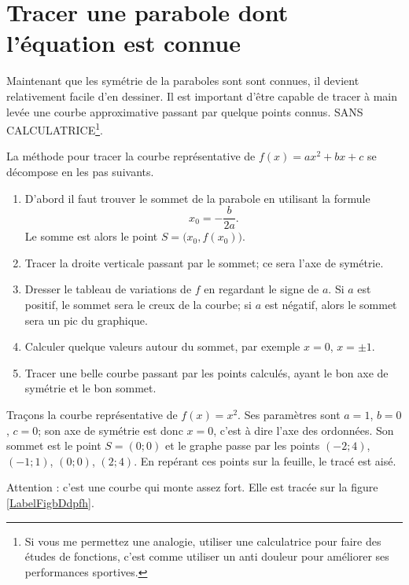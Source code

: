 \section{Tracer une parabole dont l'équation est connue}

Maintenant que les symétrie de la paraboles sont sont connues, il devient relativement facile d'en dessiner. Il est important d'être capable de tracer à main levée une courbe approximative passant par quelque points connus. SANS CALCULATRICE\footnote{Si vous me permettez une analogie, utiliser une calculatrice pour faire des études de fonctions, c'est comme utiliser un anti douleur pour améliorer ses performances sportives.}.

La méthode pour tracer la courbe représentative de \( f(x)=ax^2+bx+c\) se décompose en les pas suivants.
\begin{enumerate}
    \item
        D'abord il faut trouver le sommet de la parabole en utilisant la formule 
        \begin{equation}
            x_0=-\frac{ b }{ 2a }.
        \end{equation}
        Le somme est alors le point \( S=\big( x_0,f(x_0) \big)\).
    \item
        Tracer la droite verticale passant par le sommet; ce sera l'axe de symétrie.
    \item
        Dresser le tableau de variations de \( f\) en regardant le signe de \( a\). Si \( a\) est positif, le sommet sera le creux de la courbe; si \( a\) est négatif, alors le sommet sera un pic du graphique.
    \item
        Calculer quelque valeurs autour du sommet, par exemple \( x=0\), \( x=\pm1\).
    \item
        Tracer une belle courbe passant par les points calculés, ayant le bon axe de symétrie et le bon sommet.
\end{enumerate}

\begin{example}
    Traçons la courbe représentative de \( f(x)=x^2\). Ses paramètres sont \( a=1\), \( b=0\), \( c=0\); son axe de symétrie est donc \( x=0\), c'est à dire l'axe des ordonnées. Son sommet est le point \( S=(0;0)\) et le graphe passe par les points \( (-2;4)\), \( (-1;1)\), \( (0;0)\), \( (2;4)\). En repérant ces points sur la feuille, le tracé est aisé.

    Attention : c'est une courbe qui monte assez fort. Elle est tracée sur la figure \ref{LabelFigbDdpfh}.
\newcommand{\CaptionFigbDdpfh}{La courbe \( x\mapsto x^2\).}


\end{example}

